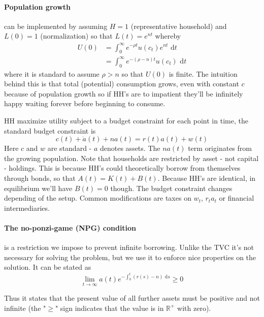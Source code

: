 \documentclass[12pt, a4paper]{article}
\begin{document}
\begin{spacing}{1.213}
\paragraph{Population growth} can be implemented by assuming $H=1$ (representative household) and $L(0)=1$ (normalization) so that $L(t) = e^{nt}$ whereby
\begin{align*}
U(0) &= \int_0^{\infty} e^{-\rho t} u(c_t) e^{nt} \textrm{ d}t \\
&= \int_0^{\infty} e^{-(\rho-n) t} u(c_t) \textrm{ d}t
\end{align*}
where it is standard to assume $\rho > n$ so that $U(0)$ is finite. The intuition behind this is that total (potential) consumption grows, even with constant $c$ because of population growth so if HH's are to impatient they'll be infinitely happy waiting forever before beginning to consume.

HH maximize utility subject to a budget constraint for each point in time, the standard budget constraint is
\begin{equation}
c(t) + \dot{a}(t) + n a(t) = r(t)a(t) + w(t)
\end{equation}
Here $c$ and $w$ are standard - $a$ denotes assets. The $na(t)$ term originates from the growing population. Note that households are restricted by asset - not capital - holdings. This is because HH's could theoretically borrow from themselves through bonds, so that $A(t) = K(t) + B(t)$. Because HH's are identical, in equilibrium we'll have $B(t) = 0$ though. The budget constraint changes depending of the setup. Common modifications are taxes on $w_t$, $r_ta_t$ or financial intermediaries.

\paragraph{The no-ponzi-game (NPG) condition} is a restriction we impose to prevent infinite borrowing. Unlike the TVC it's not necessary for solving the problem, but we use it to enforce nice properties on the solution. It can be stated as
\begin{equation}
\lim_{t \rightarrow \infty} a(t) e^{- \int_0^t (r(s)-n) \textrm{ d} s} \geq 0
\end{equation}

Thus it states that the present value of all further assets must be positive and not infinite (the "$\geq$" sign indicates that the value is in $\mathbb{R}^+$ with zero).


\end{spacing}
\end{document}
